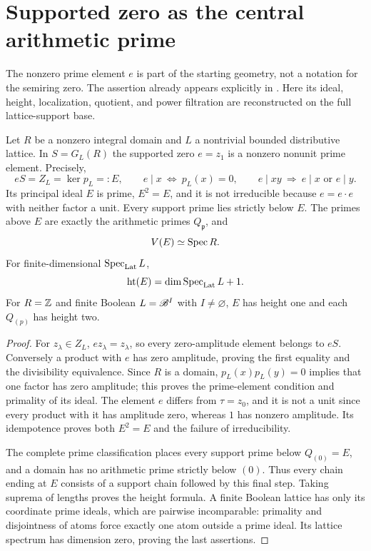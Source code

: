 \section{Supported zero as the central arithmetic prime}
\label{sec:supported-prime}
The nonzero prime element $e$ is part of the starting geometry, not a notation for the semiring zero. The assertion already appears explicitly in \cite[\texttt{thm:zero-prime-not-irr}]{globalization}. Here its ideal, height, localization, quotient, and power filtration are reconstructed on the full lattice-support base.

\begin{theorem}\label{thm:supported-zero-prime}
Let $R$ be a nonzero integral domain and $L$ a nontrivial bounded distributive lattice. In $S=G_L(R)$ the supported zero $e=z_1$ is a nonzero nonunit prime element. Precisely,
\begin{equation}\label{eq:e-divisibility}
 eS=Z_L=\ker p_L=:E,\qquad
 e\mid x\ \Longleftrightarrow\ p_L(x)=0,\qquad
 e\mid xy\ \Longrightarrow\ e\mid x\text{ or }e\mid y.
\end{equation}
Its principal ideal $E$ is prime, $E^2=E$, and it is not irreducible because $e=e\cdot e$ with neither factor a unit. Every support prime lies strictly below $E$. The primes above $E$ are exactly the arithmetic primes $Q_{\mathfrak p}$, and
\[
 V(E)\simeq\operatorname{Spec} R.
\]
For finite-dimensional $\operatorname{Spec}_{\rm Lat} L$,
\[
 \operatorname{ht}(E)=\dim\operatorname{Spec}_{\rm Lat} L+1.
\]
For $R=\mathbb Z$ and finite Boolean $L=\mathscr B^I$ with $I\ne\varnothing$, $E$ has height one and each $Q_{(p)}$ has height two.
\end{theorem}
\begin{proof}
For $z_\lambda\in Z_L$, $ez_\lambda=z_\lambda$, so every zero-amplitude element belongs to $eS$. Conversely a product with $e$ has zero amplitude, proving the first equality and the divisibility equivalence. Since $R$ is a domain, $p_L(x)p_L(y)=0$ implies that one factor has zero amplitude; this proves the prime-element condition and primality of its ideal. The element $e$ differs from $\tau=z_0$, and it is not a unit since every product with it has amplitude zero, whereas $1$ has nonzero amplitude. Its idempotence proves both $E^2=E$ and the failure of irreducibility.

The complete prime classification places every support prime below $Q_{(0)}=E$, and a domain has no arithmetic prime strictly below $(0)$. Thus every chain ending at $E$ consists of a support chain followed by this final step. Taking suprema of lengths proves the height formula. A finite Boolean lattice has only its coordinate prime ideals, which are pairwise incomparable: primality and disjointness of atoms force exactly one atom outside a prime ideal. Its lattice spectrum has dimension zero, proving the last assertions.
\end{proof}

